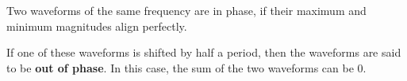 \documentclass{ximera}
\begin{document}
Two waveforms of the same frequency are in phase, if their maximum and minimum magnitudes align perfectly.

If one of these waveforms is shifted by half a period, then the waveforms are said to be \textbf{out of phase}. In this case, the sum of the two waveforms can be $0$.




\begin{center}
\end{center}
\end{document}
